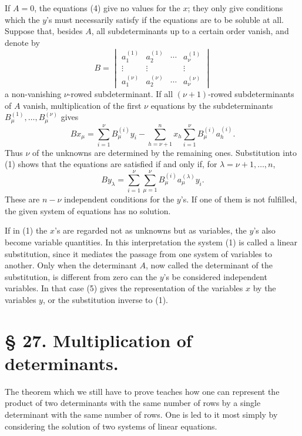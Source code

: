 \documentclass[11pt]{article}
\begin{document}
If \(A=0\), the equations (4) give no values for the \(x\); they only give conditions which the \(y\)'s must necessarily satisfy if the equations are to be soluble at all.  Suppose that, besides \(A\), all subdeterminants up to a certain order vanish, and denote by
\begin{equation}
        B=\begin{vmatrix}
        a_1^{(1)}&a_2^{(1)}&\cdots&a_\nu^{(1)}\\
        \vdots&\vdots&&\vdots\\
        a_1^{(\nu)}&a_2^{(\nu)}&\cdots&a_\nu^{(\nu)}
        \end{vmatrix}
\tag{6}
\end{equation}
a non-vanishing \(\nu\)-rowed subdeterminant.  If all \((\nu+1)\)-rowed subdeterminants of \(A\) vanish, multiplication of the first \(\nu\) equations by the subdeterminants \(B_\mu^{(1)},\ldots,B_\mu^{(\nu)}\) gives
\begin{equation}
        Bx_\mu=\sum_{i=1}^{\nu}B_\mu^{(i)}y_i
        -\sum_{h=\nu+1}^{n}x_h\sum_{i=1}^{\nu}B_\mu^{(i)}a_h^{(i)}.
\tag{7}
\end{equation}
Thus \(\nu\) of the unknowns are determined by the remaining ones.  Substitution into (1) shows that the equations are satisfied if and only if, for \(\lambda=\nu+1,
\ldots,n\),
\begin{equation}
        B y_\lambda=\sum_{i=1}^{\nu}\sum_{\mu=1}^{\nu}
        B_\mu^{(i)}a_\mu^{(\lambda)}y_i.
\tag{10}
\end{equation}
These are \(n-\nu\) independent conditions for the \(y\)'s.  If one of them is not fulfilled, the given system of equations has no solution.

If in (1) the \(x\)'s are regarded not as unknowns but as variables, the \(y\)'s also become variable quantities.  In this interpretation the system (1) is called a linear substitution, since it mediates the passage from one system of variables to another.  Only when the determinant \(A\), now called the determinant of the substitution, is different from zero can the \(y\)'s be considered independent variables.  In that case (5) gives the representation of the variables \(x\) by the variables \(y\), or the substitution inverse to (1).


\section*{§ 27. Multiplication of determinants.}

The theorem which we still have to prove teaches how one can represent the product of two determinants with the same number of rows by a single determinant with the same number of rows. One is led to it most simply by considering the solution of two systems of linear equations.
\end{document}
